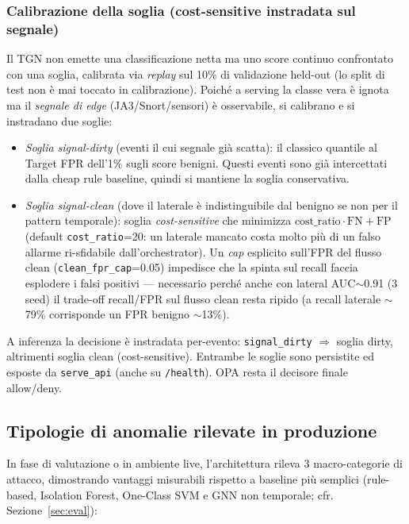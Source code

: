 \documentclass[11pt,a4paper]{report}
\begin{document}
\subsubsection{Calibrazione della soglia (cost-sensitive instradata sul segnale)}
\label{sec:threshold}

Il TGN non emette una classificazione netta ma uno score continuo confrontato con una soglia, calibrata via \textit{replay} sul 10\% di validazione held-out (lo split di test non è mai toccato in calibrazione). Poiché a serving la classe vera è ignota ma il \emph{segnale di edge} (JA3/Snort/sensori) è osservabile, si calibrano e si instradano due soglie:

\begin{itemize}
    \item \textit{Soglia signal-dirty} (eventi il cui segnale già scatta): il classico quantile al Target FPR dell'1\% sugli score benigni. Questi eventi sono già intercettati dalla cheap rule baseline, quindi si mantiene la soglia conservativa.
    \item \textit{Soglia signal-clean} (dove il laterale è indistinguibile dal benigno se non per il pattern temporale): soglia \emph{cost-sensitive} che minimizza $\text{cost\_ratio}\cdot\text{FN} + \text{FP}$ (default \texttt{cost\_ratio}=20: un laterale mancato costa molto più di un falso allarme ri-sfidabile dall'orchestrator). Un \emph{cap} esplicito sull'FPR del flusso clean (\texttt{clean\_fpr\_cap}=0.05) impedisce che la spinta sul recall faccia esplodere i falsi positivi --- necessario perché anche con lateral AUC$\sim$0.91 (3 seed) il trade-off recall/FPR sul flusso clean resta ripido (a recall laterale $\sim$79\% corrisponde un FPR benigno $\sim$13\%).
\end{itemize}

A inferenza la decisione è instradata per-evento: \texttt{signal\_dirty} $\Rightarrow$ soglia dirty, altrimenti soglia clean (cost-sensitive). Entrambe le soglie sono persistite ed esposte da \texttt{serve\_api} (anche su \texttt{/health}). OPA resta il decisore finale allow/deny.

\subsection{Tipologie di anomalie rilevate in produzione}

In fase di valutazione o in ambiente live, l'architettura rileva 3 macro-categorie di attacco, dimostrando vantaggi misurabili rispetto a baseline più semplici (rule-based, Isolation Forest, One-Class SVM e GNN non temporale; cfr. Sezione~\ref{sec:eval}):
\end{document}
